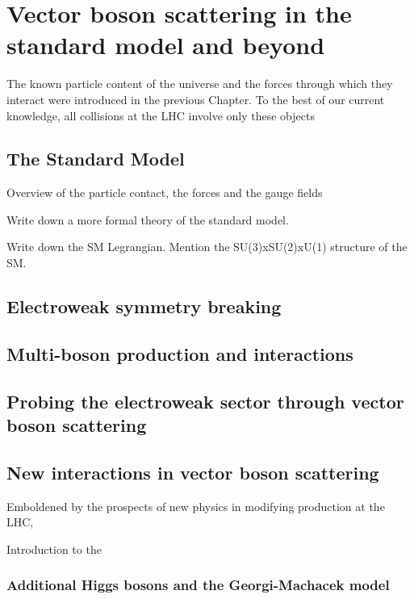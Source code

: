 \chapter{Vector boson scattering in the standard model and beyond}
\label{ch:phenomenology}

The known particle content of the universe and the forces through which
they interact were introduced in the previous Chapter. To the best of our
current knowledge, all collisions at the LHC involve only these objects
\section{The Standard Model}
Overview of the particle contact, the forces and the gauge fields

Write down a more formal theory of the standard model.

Write down the SM Legrangian. Mention the SU(3)xSU(2)xU(1) structure 
of the SM. 
\section{Electroweak symmetry breaking}
\section{Multi-boson production and interactions}
\section{Probing the electroweak sector through vector boson scattering}
\section{New interactions in vector boson scattering}

Emboldened by the prospects of new physics in modifying \WZjj production
at the LHC, 

Introduction to the 


\subsection{Additional Higgs bosons and the Georgi-Machacek model}

